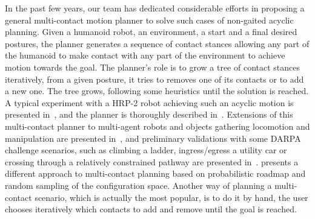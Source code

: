 In the past few years, our team has dedicated considerable efforts in proposing a general multi-contact motion planner to solve such cases of non-gaited acyclic planning.
Given a humanoid robot, an environment, a start and a final desired postures, the planner generates a sequence of contact stances allowing any part of the humanoid to make contact with any part of the environment to achieve motion towards the goal.
The planner's role is to grow a tree of contact stances iteratively, from a given posture, it tries to removes one of its contacts or to add a new one.
The tree grows, following some heuristics until the solution is reached.
A typical experiment with a HRP-2 robot achieving such an acyclic motion is presented in~\cite{escande:iser:2008}, and the planner is thoroughly described in~\cite{escande:ras:2013}.
Extensions of this multi-contact planner to multi-agent robots and objects gathering locomotion and manipulation are presented in~\cite{bouyarmane:ar:2012}, and preliminary validations with some DARPA challenge scenarios, such as climbing a ladder, ingress/egress a utility car or crossing through a relatively constrained pathway are presented in~\cite{bouyarmane:humanoids:2012}.
\cite{hauser:issr:2007} presents a different approach to multi-contact planning based on probabilistic roadmap and random sampling of the configuration space.
Another way of planning a multi-contact scenario, which is actually the most popular, is to do it by hand, the user chooses iteratively which contacts to add and remove until the goal is reached.

